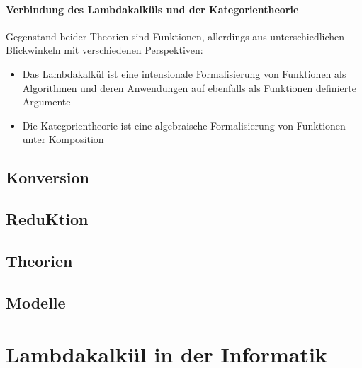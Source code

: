 \paragraph{Verbindung des Lambdakalküls und der Kategorientheorie}
Gegenstand beider Theorien sind Funktionen, allerdings aus unterschiedlichen
Blickwinkeln mit verschiedenen Perspektiven:
\begin{itemize}
\item Das Lambdakalkül ist eine intensionale Formalisierung 
	  von Funktionen als Algorithmen und deren Anwendungen auf ebenfalls
	  als Funktionen definierte Argumente
\item Die Kategorientheorie ist eine algebraische Formalisierung
	  von Funktionen unter Komposition 
\end{itemize}



\subsection{Konversion}



\subsection{ReduKtion}



\subsection{Theorien}



\subsection{Modelle}



\newpage
\section{Lambdakalkül in der Informatik}



